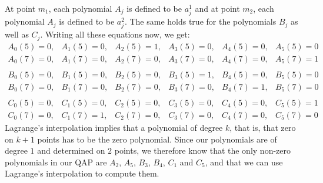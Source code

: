 \begin{example}
At point $m_1$, each polynomial $A_j$ is defined to be $a_j^1$ and at point $m_2$, each polynomial $A_j$ is defined to be $a_j^2$. The same holds true for the polynomials $B_j$ as well as $C_j$. Writing all these equations now, we get:
$$
\begin{array}{llllll}
A_0(5)=0, & A_1(5)=0, & A_2(5)=1, & A_3(5)=0, & A_4(5)=0, & A_5(5)=0 \\
A_0(7)=0, & A_1(7)=0, & A_2(7)=0, & A_3(7)=0, & A_4(7)=0, & A_5(7)=1\\
\\
B_0(5)=0, & B_1(5)=0, & B_2(5)=0, & B_3(5)=1, & B_4(5)=0, & B_5(5)=0 \\
B_0(7)=0, & B_1(7)=0, & B_2(7)=0, & B_3(7)=0, & B_4(7)=1, & B_5(7)=0\\
\\
C_0(5)=0, & C_1(5)=0, & C_2(5)=0, & C_3(5)=0, & C_4(5)=0, & C_5(5)=1 \\
C_0(7)=0, & C_1(7)=1, & C_2(7)=0, & C_3(7)=0, & C_4(7)=0, & C_5(7)=0
\end{array}
$$
Lagrange's interpolation implies that a polynomial of degree $k$, that is, that zero on $k+1$ points has to be the zero polynomial. Since our polynomials are of degree $1$ and determined on $2$ points, we therefore know that the only non-zero polynomials in our QAP are $A_2$, $A_5$, $B_3$, $B_4$, $C_1$ and $C_5$, and that we can use Lagrange's interpolation to compute them. 


\end{example}
